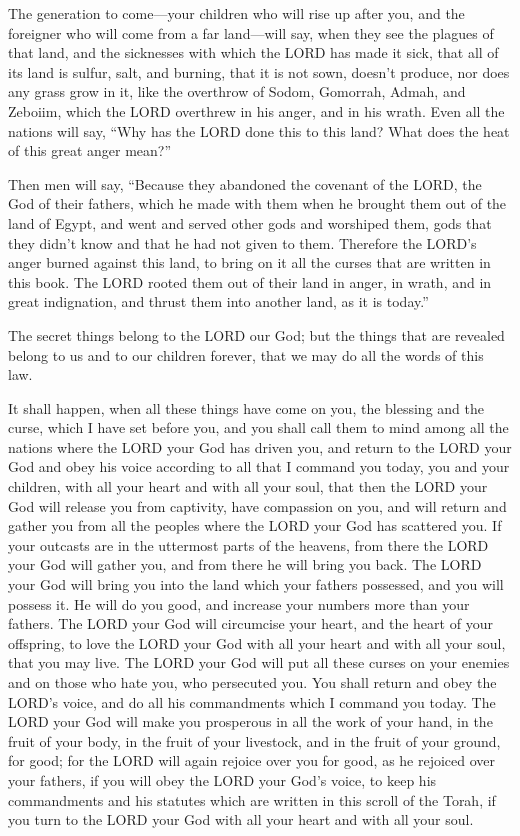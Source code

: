 \myverse{}The generation to come—your children who will rise up after
you, and the foreigner who will come from a far land—will say, when they see the plagues of that land,
and the sicknesses with which the LORD has made it sick,
\myverse{}that all of its land is sulfur, salt, and burning, that it is not sown, doesn’t
produce, nor does any grass grow in it, like the overthrow of Sodom, Gomorrah, Admah, and Zeboiim, which
the LORD overthrew in his anger, and in his wrath.
\myverse{}Even all the nations will say, “Why has the LORD done this to this land?
What does the heat of this great anger mean?”

\myverse{}Then men will say, “Because they abandoned the covenant of the
LORD, the God of their fathers, which he made with them when he brought them out of the land of Egypt,
\myverse{}and went and served other gods and worshiped them, gods that they didn’t
know and that he had not given to them.
\myverse{}Therefore the LORD’s anger burned against this land, to bring on it all the
curses that are written in this book.
\myverse{}The LORD rooted them out of their land in anger, in wrath, and in great indignation,
and thrust them into another land, as it is today.”

\myverse{}The secret things belong to the LORD our God; but the things
that are revealed belong to us and to our children forever, that we may do all the words of this law.


\mychapter{} \myverse*{}It shall happen, when all these things have come on you, the blessing
and the curse, which I have set before you, and you shall call them to mind among all the nations where
the LORD your God has driven you,
\myverse{}and return to the LORD your God and obey his voice according to all that I
command you today, you and your children, with all your heart and with all your soul,
\myverse{}that then the LORD your God will release you from captivity, have compassion
on you, and will return and gather you from all the peoples where the LORD your God has scattered you.
\myverse{}If your outcasts are in the uttermost parts of the heavens, from there the
LORD your God will gather you, and from there he will bring you back.
\myverse{}The LORD your God will bring you into the land which your fathers possessed,
and you will possess it. He will do you good, and increase your numbers more than your fathers.
\myverse{}The LORD your God will circumcise your heart, and the heart of your offspring,
to love the LORD your God with all your heart and with all your soul, that you may live.
\myverse{}The LORD your God will put all these curses on your enemies and on those who
hate you, who persecuted you.
\myverse{}You shall return and obey the LORD’s voice, and do all his commandments which
I command you today.
\myverse{}The LORD your God will make you prosperous in all the work of your hand, in
the fruit of your body, in the fruit of your livestock, and in the fruit of your ground, for good; for
the LORD will again rejoice over you for good, as he rejoiced over your fathers,
\myverse{}if you will obey the LORD your God’s voice, to keep his commandments and
his statutes which are written in this scroll of the Torah, if you turn to the LORD your God with all
your heart and with all your soul.


